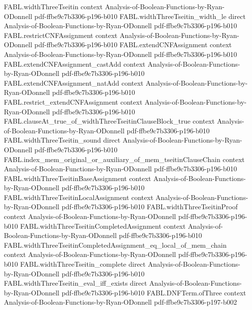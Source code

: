 \begin{theorem}
  {FABL.widthThreeTseitin}
  {context}
  {Analysis-of-Boolean-Functions-by-Ryan-ODonnell}
  {pdf-ffbe9c7b3306-p196-b010}
\proofstep
  {FABL.widthThreeTseitin_width_le}
  {direct}
  {Analysis-of-Boolean-Functions-by-Ryan-ODonnell}
  {pdf-ffbe9c7b3306-p196-b010}
\proofstep
  {FABL.restrictCNFAssignment}
  {context}
  {Analysis-of-Boolean-Functions-by-Ryan-ODonnell}
  {pdf-ffbe9c7b3306-p196-b010}
\proofstep
  {FABL.extendCNFAssignment}
  {context}
  {Analysis-of-Boolean-Functions-by-Ryan-ODonnell}
  {pdf-ffbe9c7b3306-p196-b010}
\proofstep
  {FABL.extendCNFAssignment_castAdd}
  {context}
  {Analysis-of-Boolean-Functions-by-Ryan-ODonnell}
  {pdf-ffbe9c7b3306-p196-b010}
\proofstep
  {FABL.extendCNFAssignment_natAdd}
  {context}
  {Analysis-of-Boolean-Functions-by-Ryan-ODonnell}
  {pdf-ffbe9c7b3306-p196-b010}
\proofstep
  {FABL.restrict_extendCNFAssignment}
  {context}
  {Analysis-of-Boolean-Functions-by-Ryan-ODonnell}
  {pdf-ffbe9c7b3306-p196-b010}
\proofstep
  {FABL.clauseAt_true_of_widthThreeTseitinClauseBlock_true}
  {context}
  {Analysis-of-Boolean-Functions-by-Ryan-ODonnell}
  {pdf-ffbe9c7b3306-p196-b010}
\proofstep
  {FABL.widthThreeTseitin_sound}
  {direct}
  {Analysis-of-Boolean-Functions-by-Ryan-ODonnell}
  {pdf-ffbe9c7b3306-p196-b010}
\proofstep
  {FABL.index_mem_original_or_auxiliary_of_mem_tseitinClauseChain}
  {context}
  {Analysis-of-Boolean-Functions-by-Ryan-ODonnell}
  {pdf-ffbe9c7b3306-p196-b010}
\proofstep
  {FABL.widthThreeTseitinBaseAssignment}
  {context}
  {Analysis-of-Boolean-Functions-by-Ryan-ODonnell}
  {pdf-ffbe9c7b3306-p196-b010}
\proofstep
  {FABL.widthThreeTseitinLocalAssignment}
  {context}
  {Analysis-of-Boolean-Functions-by-Ryan-ODonnell}
  {pdf-ffbe9c7b3306-p196-b010}
\proofstep
  {FABL.widthThreeTseitinProof}
  {context}
  {Analysis-of-Boolean-Functions-by-Ryan-ODonnell}
  {pdf-ffbe9c7b3306-p196-b010}
\proofstep
  {FABL.widthThreeTseitinCompletedAssignment}
  {context}
  {Analysis-of-Boolean-Functions-by-Ryan-ODonnell}
  {pdf-ffbe9c7b3306-p196-b010}
\proofstep
  {FABL.widthThreeTseitinCompletedAssignment_eq_local_of_mem_chain}
  {context}
  {Analysis-of-Boolean-Functions-by-Ryan-ODonnell}
  {pdf-ffbe9c7b3306-p196-b010}
\proofstep
  {FABL.widthThreeTseitin_complete}
  {direct}
  {Analysis-of-Boolean-Functions-by-Ryan-ODonnell}
  {pdf-ffbe9c7b3306-p196-b010}
\proofstep
  {FABL.widthThreeTseitin_eval_iff_exists}
  {direct}
  {Analysis-of-Boolean-Functions-by-Ryan-ODonnell}
  {pdf-ffbe9c7b3306-p196-b010}
\proofstep
  {FABL.DNFTerm.ofThree}
  {context}
  {Analysis-of-Boolean-Functions-by-Ryan-ODonnell}
  {pdf-ffbe9c7b3306-p197-b002}

\end{theorem}
